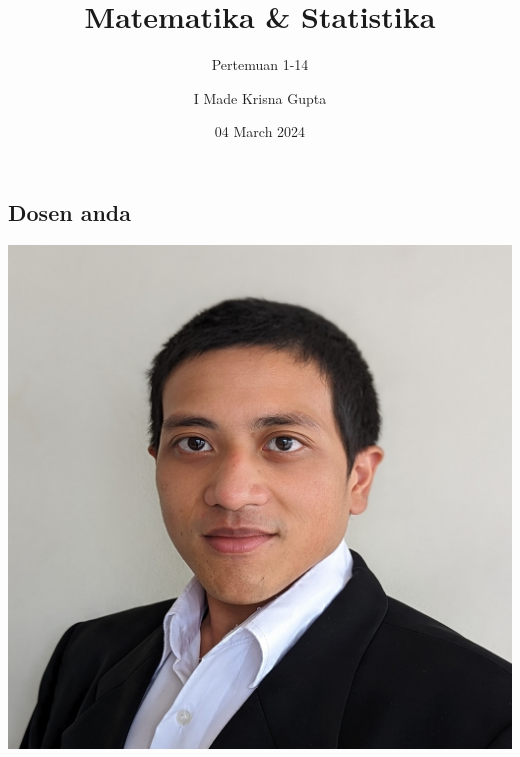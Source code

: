 \documentclass[
  letterpaper,
  DIV=11,
  numbers=noendperiod]{scrartcl}
\title{Matematika \& Statistika}
\subtitle{Pertemuan 1-14}
\author{I Made Krisna Gupta}
\date{04 March 2024}
\renewcommand*\contentsname{Table of contents}
\newcommand\contentsname{Table of contents}
\begin{document}
\maketitle

\renewcommand*\contentsname{Table of contents}
{
\hypersetup{linkcolor=}
\setcounter{tocdepth}{3}
\tableofcontents
}
\subsection{Dosen anda}\label{dosen-anda}

\includegraphics{index_files/mediabag/foto_krisna.jpg}
\end{document}
